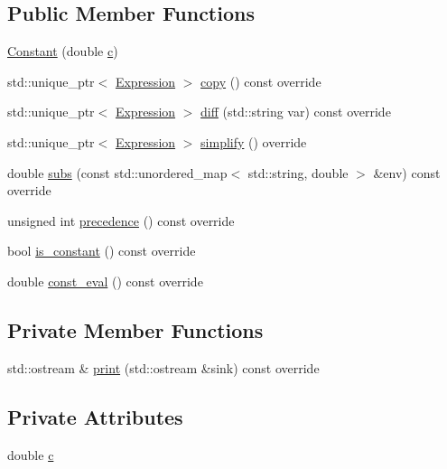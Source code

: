 \subsection*{Public Member Functions}
\begin{DoxyCompactItemize}
\item 
\mbox{\hyperlink{classsymcpp_1_1Constant_a634c91ce129b22e1b9b9afe13d4c8753}{Constant}} (double \mbox{\hyperlink{classsymcpp_1_1Constant_aff65de7395c014b7544c285bc131b336}{c}})
\item 
std\+::unique\+\_\+ptr$<$ \mbox{\hyperlink{classsymcpp_1_1Expression}{Expression}} $>$ \mbox{\hyperlink{classsymcpp_1_1Constant_aa5a5b0f6f06e6017ed641e8b89cd0cef}{copy}} () const override
\item 
std\+::unique\+\_\+ptr$<$ \mbox{\hyperlink{classsymcpp_1_1Expression}{Expression}} $>$ \mbox{\hyperlink{classsymcpp_1_1Constant_a19dd15712ce8630b758766e6478dec58}{diff}} (std\+::string var) const override
\item 
std\+::unique\+\_\+ptr$<$ \mbox{\hyperlink{classsymcpp_1_1Expression}{Expression}} $>$ \mbox{\hyperlink{classsymcpp_1_1Constant_a082044c6d521c2d31bbadd5db6354f96}{simplify}} () override
\item 
double \mbox{\hyperlink{classsymcpp_1_1Constant_ac6f62c3945429d0d318dc7d366dd4b54}{subs}} (const std\+::unordered\+\_\+map$<$ std\+::string, double $>$ \&env) const override
\item 
unsigned int \mbox{\hyperlink{classsymcpp_1_1Constant_a8c5e1e1b0cb2131d6f20b118f32a223f}{precedence}} () const override
\item 
bool \mbox{\hyperlink{classsymcpp_1_1Constant_af1ae4532a85ec5c5ed55ed8d69be68b3}{is\+\_\+constant}} () const override
\item 
double \mbox{\hyperlink{classsymcpp_1_1Constant_a9c2a9089ae171c2403e053a566929b45}{const\+\_\+eval}} () const override
\end{DoxyCompactItemize}
\subsection*{Private Member Functions}
\begin{DoxyCompactItemize}
\item 
std\+::ostream \& \mbox{\hyperlink{classsymcpp_1_1Constant_aca89e2af8df740dba562776e389edab6}{print}} (std\+::ostream \&sink) const override
\end{DoxyCompactItemize}
\subsection*{Private Attributes}
\begin{DoxyCompactItemize}
\item 
double \mbox{\hyperlink{classsymcpp_1_1Constant_aff65de7395c014b7544c285bc131b336}{c}}
\end{DoxyCompactItemize}


